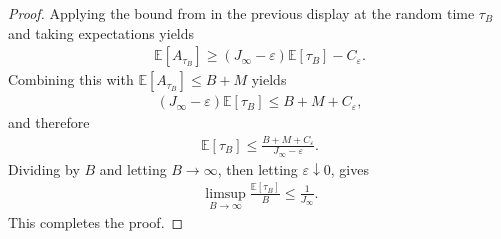 \begin{proof}
Applying the bound from in the previous display at the random time $\tau_B$ and taking expectations yields
\begin{align*}
\mathbb{E}[A_{\tau_B}]
\geq (J_\infty - \varepsilon)\mathbb{E}[\tau_B] - C_\varepsilon .
\end{align*}
Combining this with $\mathbb{E}[A_{\tau_B}] \leq B + M$ yields
\begin{align*}
(J_\infty - \varepsilon)\mathbb{E}[\tau_B]
\leq B + M + C_\varepsilon ,
\end{align*}
and therefore
\begin{align*}
\mathbb{E}[\tau_B]
\leq \frac{B + M + C_\varepsilon}{J_\infty - \varepsilon} .
\end{align*}
Dividing by $B$ and letting $B \to \infty$, then letting $\varepsilon \downarrow 0$,
gives
\begin{align*}
\limsup_{B \to \infty} \frac{\mathbb{E}[\tau_B]}{B}
\leq \frac{1}{J_\infty} .
\end{align*}
This completes the proof.
\end{proof}
